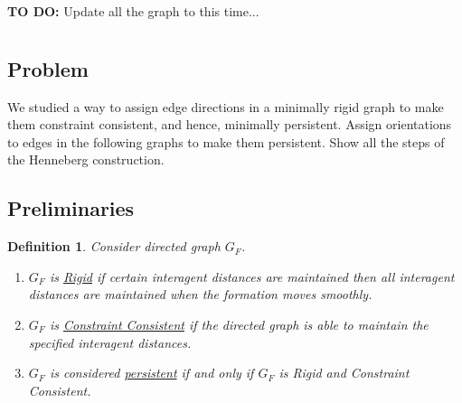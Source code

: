 \documentclass[]{article}
\numberwithin{equation}{section}
\newtheorem{definition}{Definition}
\begin{document}



\textbf{TO DO:} 
Update all the graph to this time...


\newpage
\section{}
\subsection*{Problem}
We studied a way to assign edge directions in a minimally rigid graph to make them constraint consistent, and hence, minimally persistent. 
Assign orientations to edges in the following graphs to make them persistent. 
Show all the steps of the Henneberg construction.

\subsection*{Preliminaries}
\begin{definition} \label{def:persistent}
    Consider directed graph $G_F$. 
    \begin{enumerate}
        \item $G_F$ is \emph{\underline{Rigid}} if certain interagent distances are maintained then all interagent distances are maintained when the formation moves smoothly.
        \item $G_F$ is \emph{\underline{Constraint Consistent}} if the directed graph is able to maintain the specified interagent distances.
        \item $G_F$ is considered \emph{\underline{persistent}} if and only if $G_F$ is Rigid and Constraint Consistent.
    \end{enumerate}
\end{definition}

\end{document}
